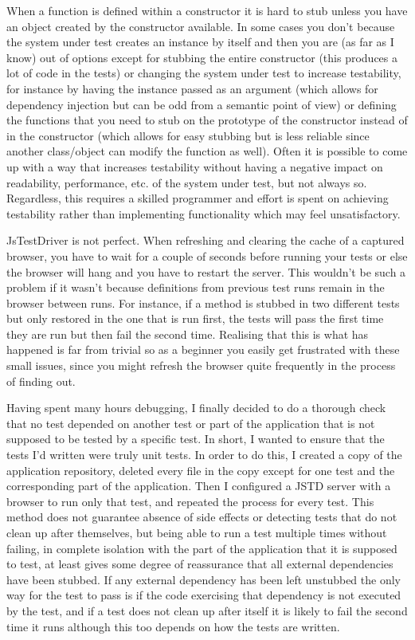 \documentclass[11pt]{article}
\begin{document}
When a function is defined within a constructor it is hard to stub unless you have an object created by the constructor available. In some cases you don't because the system under test creates an instance by itself and then you are (as far as I know) out of options except for stubbing the entire constructor (this produces a lot of code in the tests) or changing the system under test to increase testability, for instance by having the instance passed as an argument (which allows for dependency injection but can be odd from a semantic point of view) or defining the functions that you need to stub on the prototype of the constructor instead of in the constructor (which allows for easy stubbing but is less reliable since another class/object can modify the function as well). Often it is possible to come up with a way that increases testability without having a negative impact on readability, performance, etc. of the system under test, but not always so. Regardless, this requires a skilled programmer and effort is spent on achieving testability rather than implementing functionality which may feel unsatisfactory.

JsTestDriver is not perfect. When refreshing and clearing the cache of a captured browser, you have to wait for a couple of seconds before running your tests or else the browser will hang and you have to restart the server. This wouldn't be such a problem if it wasn't because definitions from previous test runs remain in the browser between runs. For instance, if a method is stubbed in two different tests but only restored in the one that is run first, the tests will pass the first time they are run but then fail the second time. Realising that this is what has happened is far from trivial so as a beginner you easily get frustrated with these small issues, since you might refresh the browser quite frequently in the process of finding out.

Having spent many hours debugging, I finally decided to do a thorough check that no test depended on another test or part of the application that is not supposed to be tested by a specific test. In short, I wanted to ensure that the tests I'd written were truly unit tests. In order to do this, I created a copy of the application repository, deleted every file in the copy except for one test and the corresponding part of the application. Then I configured a JSTD server with a browser to run only that test, and repeated the process for every test. This method does not guarantee absence of side effects or detecting tests that do not clean up after themselves, but being able to run a test multiple times without failing, in complete isolation with the part of the application that it is supposed to test, at least gives some degree of reassurance that all external dependencies have been stubbed. If any external dependency has been left unstubbed the only way for the test to pass is if the code exercising that dependency is not executed by the test, and if a test does not clean up after itself it is likely to fail the second time it runs although this too depends on how the tests are written.
\end{document}
